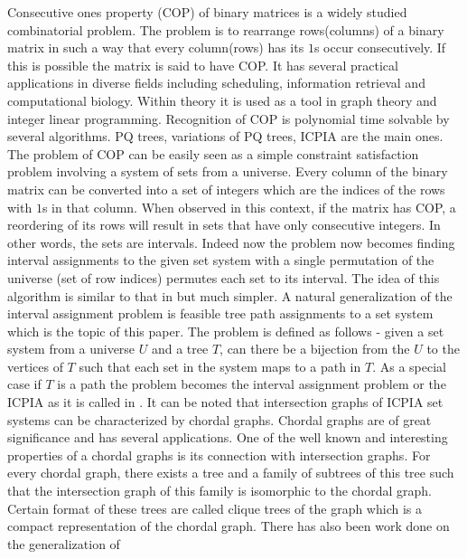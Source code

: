 \documentclass{llncs}
\begin{document}
\noindent
Consecutive ones property (COP) of binary matrices is a widely studied
combinatorial problem. The problem is to rearrange rows(columns) of a
binary matrix in such a way that every column(rows) has its $1$s occur
consecutively. If this is possible the matrix is said to have COP.  It
has several practical applications in diverse fields including
scheduling\cite{hl06}, information retrieval\cite{k77} and computational biology\cite{abh98}. Within
theory it is used as a tool in graph theory\cite{mcg04} and integer linear
programming\cite{ht02,hl06}. 
Recognition of COP is polynomial time
solvable by several algorithms. PQ trees\cite{bl76}, variations of PQ
trees\cite{mm09,wlh01,wlh02,mcc04}, ICPIA\cite{nsnrs09} are the main
ones. 
\noindent
The problem of COP can be easily seen as a 
simple constraint satisfaction problem involving a system of sets from
a universe. Every column of the binary matrix can be converted into a
set of integers which are the indices of the rows with $1$s in that
column. When observed in this context, if the matrix has COP, a
reordering of its rows will result in sets that have only consecutive
integers. In other words, the sets are intervals. Indeed now the
problem now becomes finding interval assignments to the given set
system \cite{nsnrs09} with a single permutation of the universe (set
of row
indices) permutes each set to its interval. The idea of this algorithm
is similar to that in \cite{wlh02} but much simpler. 
\noindent
A natural generalization of the interval assignment problem is
feasible tree path assignments to a set system which is the topic of
this paper. The problem is defined as follows - given a set system
from a universe $U$ and a tree $T$, can there be a bijection from the
$U$ to the vertices of $T$ such that each set in the system maps to a
path in $T$. As a special case if $T$ is a path the problem becomes
the interval assignment problem or the ICPIA as it is called in
\cite{nsnrs09}. 
\noindent 
It can be noted that intersection graphs of ICPIA set systems can be
characterized by chordal graphs. Chordal
graphs are of great significance and has several applications. One of
the well known and interesting properties of a chordal graphs is its
connection with intersection graphs\cite{mcg04}. For every chordal
graph, there exists a tree and a family of subtrees of this tree such
that the intersection graph of this family is isomorphic to the
chordal graph\cite{plr70,gav78,bp93}. Certain format of these trees are called clique
trees\cite{apy92} of the graph which is a compact representation of the
chordal graph. There has also been work done on the generalization of
\end{document}
